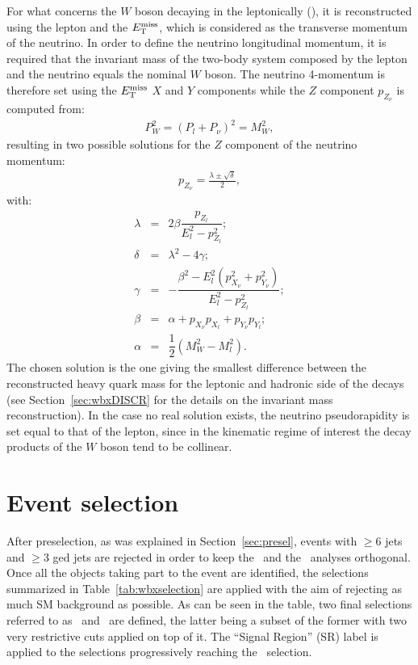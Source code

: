For what concerns the $W$ boson decaying in the leptonically (\wlep),
it is reconstructed using the lepton and the $\met$, 
which is considered as the transverse momentum of the neutrino. 
In order to define the neutrino longitudinal momentum, it is required that
the invariant mass of the two-body system composed by the lepton and the neutrino 
equals the nominal $W$ boson. 
The neutrino 4-momentum is therefore set using the $\met$ $X$ and $Y$ components
while the $Z$ component $p_{Z_\nu}$ is computed from: 
\begin{eqnarray}
P_W^2 = (P_l + P_{\nu})^2 = M_W^2,
\end{eqnarray}
resulting in two possible solutions for the 
$Z$ component of the neutrino momentum:
\begin{eqnarray}
p_{Z_\nu} = \frac{\lambda \pm \sqrt{\delta} }{2},
\end{eqnarray}
with:
\begin{eqnarray}
\lambda &=& 2\beta \dfrac{p_{Z_l}}{E_l^2-p_{Z_l}^2};\\
\delta  &=& \lambda^2 - 4\gamma;\\
\gamma &=& -\dfrac{\beta^2 - E_l^2 (p_{X_\nu}^2+p_{Y_\nu}^2)}{E_l^2-p_{Z_l}^2}; \\
\beta  &=& \alpha + p_{X_\nu}p_{X_l} + p_{Y_\nu}p_{Y_l}; \\
\alpha &=& \dfrac{1}{2}(M_W^2 - M_l^2).
\end{eqnarray}
The chosen solution is the one giving
the smallest difference between the reconstructed 
heavy quark mass for the
leptonic and hadronic side of the decays (see Section~\ref{sec:wbxDISCR} 
for the details on the invariant mass reconstruction).
In the case no real solution exists, the neutrino pseudorapidity 
is set equal to that of the lepton, since in the kinematic regime of interest  
the decay products of the $W$ boson tend to be collinear.


\section{Event selection}\label{sec:wbxEVT}

After preselection, as was explained in Section~\ref{sec:presel},
events with $\geq$6 jets and $\geq$3 \btag ged jets are rejected in order to
keep the \wbx\ and the \htx\ analyses orthogonal.
Once all the objects taking part to the event are identified,
the selections summarized in Table~\ref{tab:wbxselection} are
applied with the aim of rejecting as much SM background
as possible. As can be seen in the table, two final selections referred to as
\loose\ and \tight\ are defined, the latter being a
subset of the former with two very restrictive cuts applied on top of it.
The ``Signal Region'' (SR) label is applied to the selections
progressively reaching the \tight\ selection.

